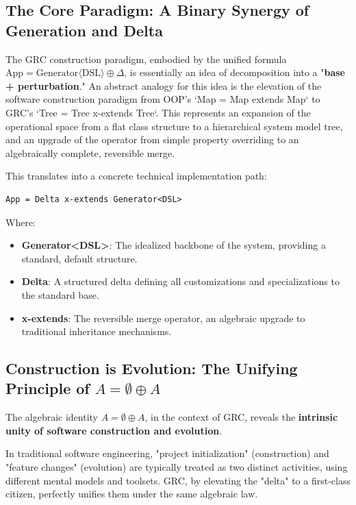 \documentclass[11pt]{article}
\begin{document}
\subsection{The Core Paradigm: A Binary Synergy of Generation and Delta}

The GRC construction paradigm, embodied by the unified formula $\text{App} = \text{Generator}\langle\text{DSL}\rangle \oplus \Delta$, is essentially an idea of decomposition into a "\textbf{base + perturbation}." An abstract analogy for this idea is the elevation of the software construction paradigm from OOP's `Map = Map extends Map` to GRC's `Tree = Tree x-extends Tree`. This represents an expansion of the operational space from a flat class structure to a hierarchical system model tree, and an upgrade of the operator from simple property overriding to an algebraically complete, reversible merge.

This translates into a concrete technical implementation path:

\begin{verbatim}
App = Delta x-extends Generator<DSL>
\end{verbatim}

Where:
\begin{itemize}
    \item \textbf{Generator<DSL>}: The idealized backbone of the system, providing a standard, default structure.
    \item \textbf{Delta}: A structured delta defining all customizations and specializations to the standard base.
    \item \textbf{x-extends}: The reversible merge operator, an algebraic upgrade to traditional inheritance mechanisms.
\end{itemize}

\subsection{Construction is Evolution: The Unifying Principle of $A = \emptyset \oplus A$}

The algebraic identity $A = \emptyset \oplus A$, in the context of GRC, reveals the \textbf{intrinsic unity of software construction and evolution}.

In traditional software engineering, "project initialization" (construction) and "feature changes" (evolution) are typically treated as two distinct activities, using different mental models and toolsets. GRC, by elevating the "delta" to a first-class citizen, perfectly unifies them under the same algebraic law.
\end{document}

